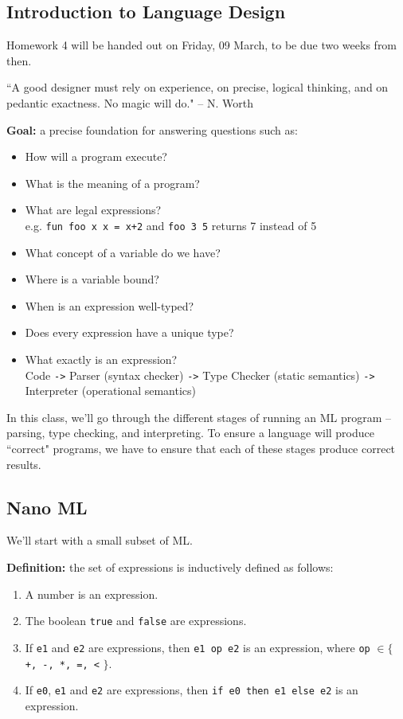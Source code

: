 \documentclass[11pt]{article}
\begin{document}
\subsection{Introduction to Language Design}

Homework 4 will be handed out on Friday, 09 March, to be due two weeks from then.

``A good designer must rely on experience, on precise, logical thinking, and on pedantic exactness. No magic will do." -- N. Worth

\textbf{Goal:} a precise foundation for answering questions such as:
\begin{itemize}
    \item How will a program execute?
    \item What is the meaning of a program?
    \item What are legal expressions? \\
            e.g. \verb~fun foo x x = x+2~ and \verb~foo 3 5~ returns 7 instead of 5
    \item What concept of a variable do we have?
    \item Where is a variable bound?
    \item When is an expression well-typed?
    \item Does every expression have a unique type?
    \item What exactly is an expression? \\
            Code \verb~->~ Parser (syntax checker) \verb~->~ Type Checker (static semantics) \verb~->~ Interpreter (operational semantics)
\end{itemize}

In this class, we'll go through the different stages of running an ML program -- parsing, type checking, and interpreting. To ensure a language will produce ``correct" programs, we have to ensure that each of these stages produce correct results. 

\subsection{Nano ML}
We'll start with a small subset of ML. 

\textbf{Definition:} the set of expressions is inductively defined as follows:
\begin{enumerate}
    \item A number is an expression.
    \item The boolean \verb~true~ and \verb~false~ are expressions.
    \item If \verb~e1~ and \verb~e2~ are expressions, then \verb~e1 op e2~ is an expression, where \verb~op~ $\in \{$ \verb~+, -, *, =, <~ $\}$.
    \item If \verb~e0~, \verb~e1~ and \verb~e2~ are expressions, then \verb~if e0 then e1 else e2~ is an expression.
\end{enumerate}
\end{document}
